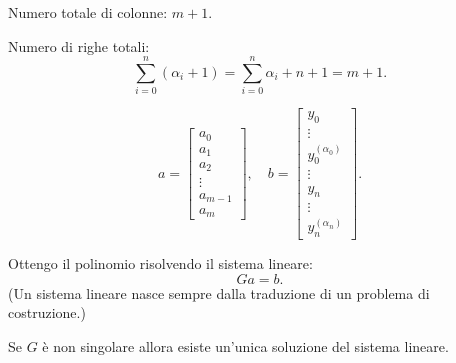 \begin{dimo}
\begin{flushleft}
Numero totale di colonne: $m+1$.

Numero di righe totali:
\[
\sum_{i = 0}^{n}(\alpha_i+1) = \sum_{i = 0}^{n}\alpha_i + n +1 = m+1.
\]
\end{flushleft}

\[ a =
\left[\begin{array}{c}
a_0 \\
a_1 \\
a_2 \\
\vdots \\
a_{m-1} \\
a_m
\end{array}\right], \quad b =
\left[\begin{array}{c}
y_0 \\
\vdots \\
y_0^{(\alpha_0)} \\
\vdots \\
y_n \\
\vdots \\
y_n^{(\alpha_n)}
\end{array}\right].
\]


Ottengo il polinomio risolvendo il sistema lineare:
\[Ga = b.\]
(Un sistema lineare nasce sempre dalla traduzione di un problema di
costruzione.)

\begin{prop}
Se $G$ è non singolare allora esiste un'unica soluzione del sistema lineare.
\end{prop}


\end{dimo}
